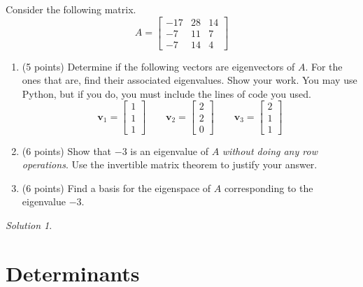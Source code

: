 \documentclass{article}
\theoremstyle{remark}
\newtheorem*{solution}{Solution}
\newcommand{\vv}[1]{\mathbf{#1}}
\begin{document}
Consider the following matrix.
\begin{displaymath}
  A =
  \begin{bmatrix}
    -17 & 28 & 14 \\
    -7 & 11 & 7 \\
    -7 & 14 & 4
  \end{bmatrix}
\end{displaymath}
\begin{enumerate}
\item (5 points)
  Determine if the following vectors are eigenvectors of $A$. For the ones that are, find their associated eigenvalues. Show your work. You may use Python, but if you do, you must include the lines of code you used.
  \begin{displaymath}
    \vv v_1 =
    \begin{bmatrix}
      1 \\ 1 \\ 1
    \end{bmatrix}
    \qquad
    \vv v_2 =
    \begin{bmatrix}
      2 \\ 2 \\ 0
    \end{bmatrix}
    \qquad
    \vv v_3 =
    \begin{bmatrix}
      2 \\ 1 \\ 1
    \end{bmatrix}
  \end{displaymath}
\item (6 points)
  Show that $-3$ is an eigenvalue of $A$ \textit{without doing any row operations}.
  Use the invertible matrix theorem to justify your answer.
\item (6 points)
  Find a basis for the eigenspace of $A$ corresponding to the eigenvalue $-3$.
\end{enumerate}

\medskip

\begin{solution}
\end{solution}

\pagebreak
\section{Determinants}
\end{document}
